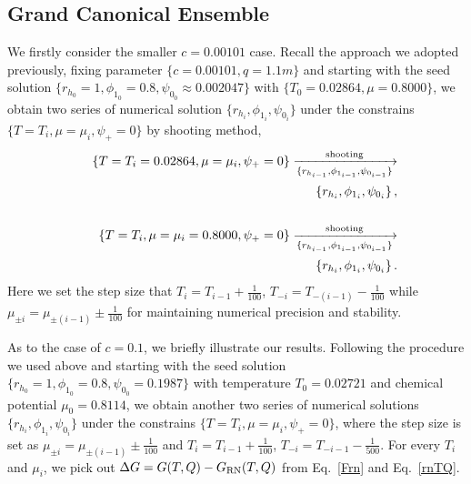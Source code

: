 \documentclass[pr, twocolumn, preprintnumbers, showpacs,footnoteadded, superscriptaddress,nofootinbib,longbibliography]{revtex4-1}
\begin{document}
\subsection{Grand Canonical Ensemble}\label{graapp}
We firstly consider the smaller $c=0.00101$ case. Recall the approach we adopted previously, fixing parameter $\{c=0.00101, q=1.1m\}$ and starting with the seed solution $\{r_{h_0}=1, \phi_{1_0}=0.8, \psi_{0_0} \approx 0.002047\}$ with $\{T_0=0.02864, \mu=0.8000\}$, we obtain two series of numerical solution $\{r_{h_i}, \phi_{1_i}, \psi_{0_i}\}$ under the constrains $\{T=T_i, \mu=\mu_i, \psi_+=0 \}$ by shooting method,
%
\begin{eqnarray}
&& \{T=T_i = 0.02864, \mu=\mu_i ,\psi_+=0 \}   \xrightarrow[\{r_{h_{i-1}}, \phi_{1_{i-1}}, \psi_{0_{i-1}} \}]{\text{shooting}} \cr
&& \{r_{h_{i}}, \phi_{1_{i}}, \psi_{0_{i}} \}\, ,  \\
~\cr
&& \{T=T_i, \mu=\mu_i=0.8000 ,\psi_+=0 \}   \xrightarrow[\{r_{h_{i-1}}, \phi_{1_{i-1}}, \psi_{0_{i-1}} \}]{\text{shooting}}  \cr
&& \{r_{h_{i}}, \phi_{1_{i}}, \psi_{0_{i}} \}\, .
\end{eqnarray}
%
Here we set the step size that $T_i=T_{i-1}+\frac{1}{100}$, $T_{-i}=T_{-(i-1)}-\frac{1}{100}$ while $\mu_{\pm i}=\mu_{\pm (i-1)} \pm \frac{1}{100}$ for maintaining numerical precision and stability.

As to the case of $c=0.1$, we briefly illustrate our results. Following the procedure we used above and starting with the seed solution $\{r_{h_0}=1, \phi_{1_0}=0.8, \psi_{0_0}=0.1987 \}$ with temperature $T_0=0.02721$ and chemical potential $\mu_0=0.8114$, we obtain another two series of numerical solutions $\{r_{h_i}, \phi_{1_i}, \psi_{0_i}\}$ under the constrains $\{T=T_i, \mu=\mu_i, \psi_+=0 \}$, where the step size is set as $\mu_{\pm i}=\mu_{\pm(i-1)} \pm \frac{1}{100}$ and $T_{i}=T_{i-1}+\frac{1}{100}$, $T_{-i}=T_{-i-1}-\frac{1}{500}$. For every $T_i$ and $\mu_i$, we pick out $\Delta G = G(T,Q)-G_{\rm RN}(T,Q)$ from Eq.~\eqref{Frn} and Eq.~\eqref{rnTQ}.
\end{document}
